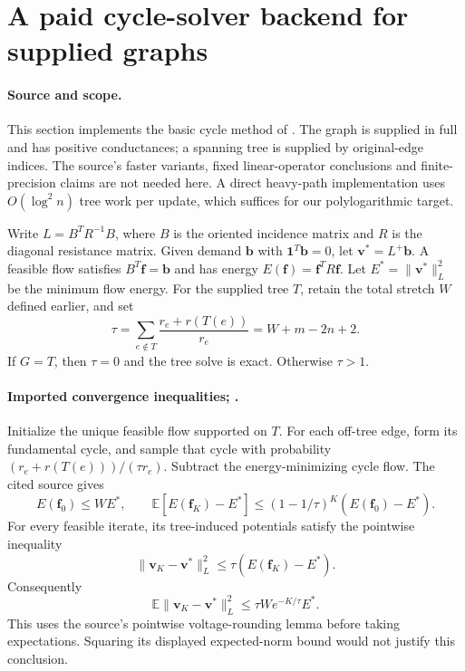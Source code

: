 \section[Paid cycle solves]{A paid cycle-solver backend for supplied graphs}
\label{sec:op3-weighted-cycle-solver}

\paragraph{Source and scope.}
This section implements the basic cycle method of
\citet[Algorithm 1, Theorem 4.1 and Lemmas 6.1--6.2, PDF pp.\ 8,13--14]{kelner2013simple}.
The graph is supplied in full and has positive conductances; a spanning
tree is supplied by original-edge indices. The source's faster variants,
fixed linear-operator conclusions and finite-precision claims are not
needed here. A direct heavy-path implementation uses $O(\log^2 n)$
tree work per update, which suffices for our polylogarithmic target.

Write $L=B^T R^{-1}B$, where $B$ is the oriented incidence matrix and
$R$ is the diagonal resistance matrix. Given demand $\bm b$ with
$\bm1^T\bm b=0$, let $\bm v^*=L^+\bm b$. A feasible flow satisfies
$B^T\bm f=\bm b$ and has energy $E(\bm f)=\bm f^TR\bm f$.
Let $E^*=\|\bm v^*\|_L^2$ be the minimum flow energy.
For the supplied tree $T$, retain the total stretch $W$ defined earlier,
and set
\[
 \tau=\sum_{e\notin T}\frac{r_e+r(T(e))}{r_e}
      =W+m-2n+2.
\]
If $G=T$, then $\tau=0$ and the tree solve is exact. Otherwise $\tau>1$.

\paragraph{Imported convergence inequalities; \statussource.}
Initialize the unique feasible flow supported on $T$. For each off-tree
edge, form its fundamental cycle, and sample that cycle with probability
$(r_e+r(T(e)))/(\tau r_e)$. Subtract the energy-minimizing cycle flow.
The cited source gives
\[
 E(\bm f_0)\leq W E^*,\qquad
 \mathbb E[E(\bm f_K)-E^*]
 \leq(1-1/\tau)^K(E(\bm f_0)-E^*).
\]
For every feasible iterate, its tree-induced potentials satisfy the
pointwise inequality
\[
 \|\bm v_K-\bm v^*\|_L^2\leq\tau(E(\bm f_K)-E^*).
\]
Consequently
\begin{equation}
 \mathbb E\|\bm v_K-\bm v^*\|_L^2
 \leq\tau W e^{-K/\tau}E^*.
 \label{eq:op3-cycle-squared-error}
\end{equation}
This uses the source's pointwise voltage-rounding lemma before taking
expectations. Squaring its displayed expected-norm bound would not
justify this conclusion.

